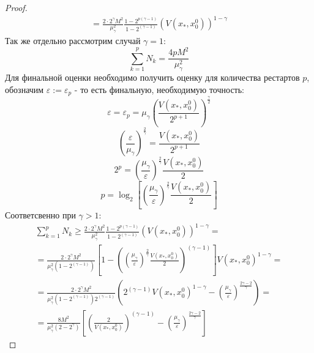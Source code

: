 \begin{proof}
\begin{equation}
\begin{aligned}
           = \frac{2 \cdot 2^{\gamma} M^2}{\mu_{\gamma}^2} \frac{1 - 2^{p(\gamma-1)}}{1 - 2^{(\gamma-1)}} (V(x_*, x_0^0))^{1 - \gamma}
       \end{aligned}
       \end{equation}
       Так же отдельно рассмотрим случай $\gamma = 1$:
       \begin{equation}
           \sum_{k=1}^{p} N_k = \frac{4 p M^2}{\mu_{\gamma}^2} 
       \end{equation}
       Для финальной оценки необходимо получить оценку для количества рестартов $p$, обозначим $\varepsilon := \varepsilon_p$ - то есть финальную, необходимую точность:
       \begin{equation}
           \varepsilon = \varepsilon_p = \mu_{\gamma} \left(\frac{V(x_*, x_0^0)}{2^{p+1}}\right)^{\frac{\gamma}{2}}
       \end{equation}
       \begin{equation}
           \left(\frac{\varepsilon}{\mu_{\gamma}}\right)^{\frac{2}{\gamma}} =  \frac{V(x_*, x_0^0)}{2^{p+1}}
       \end{equation}
       \begin{equation}
            2^p =  \left(\frac{\mu_{\gamma}}{\varepsilon}\right)^{\frac{2}{\gamma}} \frac{V(x_*, x_0^0)}{2}
       \end{equation}
       \begin{equation}
            p = \log_2{\left[\left(\frac{\mu_{\gamma}}{\varepsilon}\right)^{\frac{2}{\gamma}} \frac{V(x_*, x_0^0)}{2}\right]}
       \end{equation}
       Соответсвенно при $\gamma > 1$:
       \begin{equation}
       \begin{aligned}
           \sum_{k=1}^{p} N_k \geq \frac{2 \cdot 2^{\gamma} M^2}{\mu_{\gamma}^2} \frac{1 - 2^{p(\gamma-1)}}{1 - 2^{(\gamma-1)}} (V(x_*, x_0^0))^{1 - \gamma} = \\
           = \frac{2 \cdot 2^{\gamma} M^2}{\mu_{\gamma}^2 (1 - 2^{(\gamma-1)})} \left[1 - \left(\left(\frac{\mu_{\gamma}}{\varepsilon}\right)^{\frac{2}{\gamma}} \frac{V(x_*, x_0^0)}{2}\right) ^{(\gamma-1)}\right] V(x_*, x_0^0)^{1 - \gamma} = \\
           = \frac{2 \cdot 2^{\gamma} M^2}{\mu_{\gamma}^2 (1 - 2^{(\gamma-1)}) 2^{(\gamma - 1)}} \left(2^{(\gamma - 1)}V(x_*, x_0^0)^{1 - \gamma}  - \left(\frac{\mu_{\gamma}}{\varepsilon}\right)^{\frac{2\gamma - 2}{\gamma}}\right) = \\ 
           = \frac{8  M^2}{\mu_{\gamma}^2 (2 - 2^{\gamma})} \left[\left(\frac{2}{V(x_*, x_0^0)}\right)^{(\gamma - 1)}  - \left(\frac{\mu_{\gamma}}{\varepsilon}\right)^{\frac{2\gamma - 2}{\gamma}}\right] 

\end{aligned}
\end{equation}
\end{proof}
